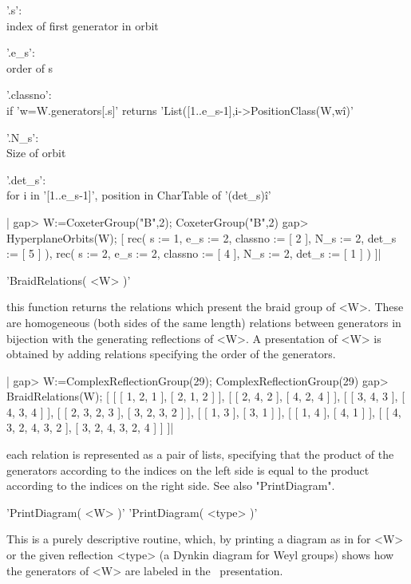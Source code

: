  '.s':\\      index of first generator in orbit

 '.e\_s':\\    order of s

 '.classno':\\ if 'w=W.generators[.s]' returns
   'List([1..e\_s-1],i->PositionClass(W,w\^i)'

 '.N\_s':\\    Size of orbit

 '.det\_s':\\  for i in '[1..e\_s-1]', position in CharTable of '(det\_s)\^i'

|    gap> W:=CoxeterGroup("B",2);
    CoxeterGroup("B",2)
    gap> HyperplaneOrbits(W);
    [ rec(
          s := 1,
          e_s := 2,
          classno := [ 2 ],
          N_s := 2,
          det_s := [ 5 ] ), rec(
          s := 2,
          e_s := 2,
          classno := [ 4 ],
          N_s := 2,
          det_s := [ 1 ] ) ]|


'BraidRelations( <W> )'

this function  returns the  relations which present  the braid  group of
<W>. These  are homogeneous  (both sides of  the same  length) relations
between generators in bijection with  the generating reflections of <W>.
A presentation  of <W>  is obtained by  adding relations  specifying the
order of the generators.

|    gap> W:=ComplexReflectionGroup(29);
    ComplexReflectionGroup(29)
    gap> BraidRelations(W);
    [ [ [ 1, 2, 1 ], [ 2, 1, 2 ] ], [ [ 2, 4, 2 ], [ 4, 2, 4 ] ],
      [ [ 3, 4, 3 ], [ 4, 3, 4 ] ], [ [ 2, 3, 2, 3 ], [ 3, 2, 3, 2 ] ],
      [ [ 1, 3 ], [ 3, 1 ] ], [ [ 1, 4 ], [ 4, 1 ] ],
      [ [ 4, 3, 2, 4, 3, 2 ], [ 3, 2, 4, 3, 2, 4 ] ] ]|

each relation  is represented as  a pair  of lists, specifying  that the
product of the  generators according to the indices on  the left side is
equal to  the product according  to the indices  on the right  side. See
also "PrintDiagram".

%
%

'PrintDiagram( <W> )'
'PrintDiagram( <type> )'

This is a purely descriptive routine, which, by printing a diagram as in
\cite{BMR98} for  <W> or the  given reflection <type> (a  Dynkin diagram
for Weyl  groups) shows  how the  generators of <W>  are labeled  in the
\CHEVIE\ presentation.

